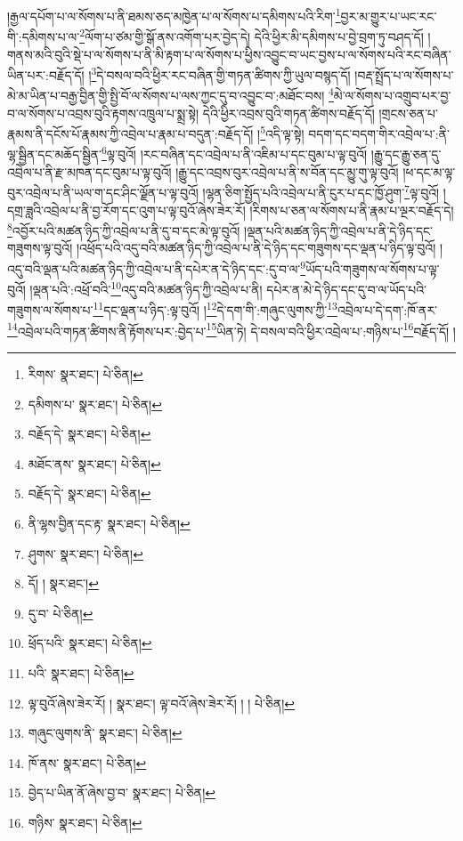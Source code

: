 །རྒྱལ་དཔོག་པ་ལ་སོགས་པ་ནི་ཐམས་ཅད་མཁྱེན་པ་ལ་སོགས་པ་དམིགས་པའི་རིག་\footnote{རིགས་  སྣར་ཐང་།  པེ་ཅིན། }བྱར་མ་གྱུར་པ་ཡང་རང་གི་:དམིགས་པ་ལ་\footnote{དམིགས་པ་  སྣར་ཐང་།  པེ་ཅིན། }ལོག་པ་ཙམ་གྱི་སྒོ་ནས་འགོག་པར་བྱེད་དེ། དེའི་ཕྱིར་མི་དམིགས་པ་བྱེ་བྲག་ཏུ་བཤད་དོ། །གནས་མའི་བུའི་སྡེ་པ་ལ་སོགས་པ་ནི་མི་རྟག་པ་ལ་སོགས་པ་ཕྱིས་འབྱུང་བ་ཡང་བྱས་པ་ལ་སོགས་པའི་རང་བཞིན་ཡིན་པར་:བརྗོད་དོ། །\footnote{བརྗོད་དེ་  སྣར་ཐང་།  པེ་ཅིན། }དེ་བསལ་བའི་ཕྱིར་རང་བཞིན་གྱི་གཏན་ཚིགས་ཀྱི་ཡུལ་བསྙད་དོ། །བརྡ་སྤྲོད་པ་ལ་སོགས་པ་མེ་མ་ཡིན་པ་བརྒྱ་བྱིན་གྱི་སྤྱི་བོ་ལ་སོགས་པ་ལས་ཀྱང་དུ་བ་འབྱུང་བ་:མཐོང་བས། \footnote{མཐོང་ནས་  སྣར་ཐང་།  པེ་ཅིན། }མེ་ལ་སོགས་པ་འགྲུབ་པར་བྱ་བ་ལ་སོགས་པ་འབྲས་བུའི་རྟགས་འཁྲུལ་པ་སྨྲ་སྟེ། དེའི་ཕྱིར་འབྲས་བུའི་གཏན་ཚིགས་བརྗོད་དོ། །གྲངས་ཅན་པ་རྣམས་ནི་དངོས་པོ་རྣམས་ཀྱི་འབྲེལ་པ་རྣམ་པ་བདུན་:བརྗོད་དོ། །\footnote{བརྗོད་དེ་  སྣར་ཐང་།  པེ་ཅིན། }འདི་ལྟ་སྟེ། བདག་དང་བདག་གིར་འབྲེལ་པ་:ནི་ལྷ་སྦྱིན་དང་མཆོད་སྦྱིན་\footnote{ནི་ལྷས་བྱིན་དང་རྟ་  སྣར་ཐང་།  པེ་ཅིན། }ལྟ་བུའོ། །རང་བཞིན་དང་འབྲེལ་པ་ནི་འཇིམ་པ་དང་བུམ་པ་ལྟ་བུའོ། །རྒྱུ་དང་རྒྱུ་ཅན་དུ་འབྲེལ་པ་ནི་རྫ་མཁན་དང་བུམ་པ་ལྟ་བུའོ། །རྒྱུ་དང་འབྲས་བུར་འབྲེལ་པ་ནི་ས་བོན་དང་མྱུ་གུ་ལྟ་བུའོ། །ཕ་དང་མ་ལྟ་བུར་འབྲེལ་པ་ནི་ཡལ་ག་དང་ཤིང་ལྗོན་པ་ལྟ་བུའོ། །ལྷན་ཅིག་སྤྱོད་པའི་འབྲེལ་པ་ནི་ངུར་པ་དང་ཁྱོ་ཤུག་\footnote{ཤུགས་  སྣར་ཐང་།  པེ་ཅིན། }ལྟ་བུའོ། །དགྲ་ཟླའི་འབྲེལ་པ་ནི་བྱ་རོག་དང་འུག་པ་ལྟ་བུའོ་ཞེས་ཟེར་རོ། །རིགས་པ་ཅན་ལ་སོགས་པ་ནི་རྣམ་པ་ལྔར་བརྗོད་དེ། \footnote{དོ། །   སྣར་ཐང་། }འབྱོར་པའི་མཚན་ཉིད་ཀྱི་འབྲེལ་པ་ནི་དུ་བ་དང་མེ་ལྟ་བུའོ། །ལྡན་པའི་མཚན་ཉིད་ཀྱི་འབྲེལ་པ་ནི་དེ་ཉིད་དང་གཟུགས་ལྟ་བུའོ། །འཕྲོད་པའི་འདུ་བའི་མཚན་ཉིད་ཀྱི་འབྲེལ་པ་ནི་དེ་ཉིད་དང་གཟུགས་དང་ལྡན་པ་ཉིད་ལྟ་བུའོ། །འདུ་བའི་ལྡན་པའི་མཚན་ཉིད་ཀྱི་འབྲེལ་པ་ནི་དཔེར་ན་དེ་ཉིད་དང་:དུ་བ་ལ་\footnote{དུ་བ་  པེ་ཅིན། }ཡོད་པའི་གཟུགས་ལ་སོགས་པ་ལྟ་བུའོ། །ལྡན་པའི་:འཕྲོ་བའི་\footnote{ཕྲོད་པའི་  སྣར་ཐང་།  པེ་ཅིན། }འདུ་བའི་མཚན་ཉིད་ཀྱི་འབྲེལ་པ་ནི། དཔེར་ན་མེ་དེ་ཉིད་དང་དུ་བ་ལ་ཡོད་པའི་གཟུགས་ལ་སོགས་པ་\footnote{པའི་  སྣར་ཐང་།  པེ་ཅིན། }དང་ལྡན་པ་ཉིད་:ལྟ་བུའོ། །\footnote{ལྟ་བུའོ་ཞེས་ཟེར་རོ། །  སྣར་ཐང་། ལྟ་བའོ་ཞེས་ཟེར་རོ། ། །  པེ་ཅིན། }དེ་དག་གི་:གཞུང་ལུགས་ཀྱི་\footnote{གཞུང་ལུགས་ནི་  སྣར་ཐང་།  པེ་ཅིན། }འབྲེལ་པ་དེ་དག་:ཁོ་ནར་\footnote{ཁོ་ནས་  སྣར་ཐང་།  པེ་ཅིན། }འབྲེལ་པའི་གཏན་ཚིགས་ནི་རྟོགས་པར་:བྱེད་པ་\footnote{བྱེད་པ་ཡིན་ནོ་ཞེས་བྱ་བ་  སྣར་ཐང་།  པེ་ཅིན། }ཡིན་ཏེ། དེ་བསལ་བའི་ཕྱིར་འབྲེལ་པ་:གཉིས་པ་\footnote{གཉིས་  སྣར་ཐང་།  པེ་ཅིན། }བརྗོད་དོ། །

